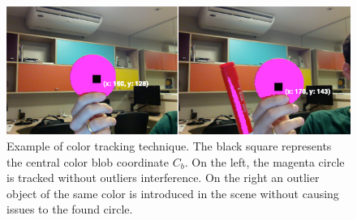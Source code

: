 \begin{figure}[!htb]
  \centering
  \includegraphics[width=\linewidth]{chapters/tracking_library_for_the_web/color_tracking.png}
  \caption{Example of color tracking technique. The black square represents the central color blob coordinate $C_b$. On the left, the magenta circle is tracked without outliers interference. On the right an outlier object of the same color is introduced in the scene without causing issues to the found circle.}
  \label{figure:color_tracking}
\end{figure}




